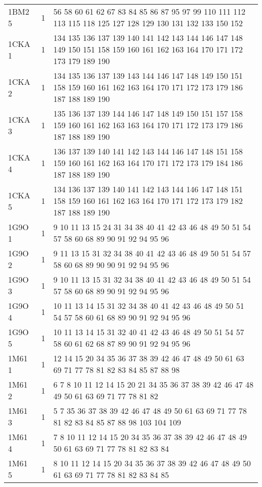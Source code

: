\begin{table}[!htbp]
{\begin{tabular}{lll}
        1BM2 5 & 1 & 56 58 60 61 62 67 83 84 85 86 87 95 97 99 110 111 112 113 115 118 125 127 128 129 130 131 132 133 150 152 \\
        1CKA 1 & 1 & 134 135 136 137 139 140 141 142 143 144 146 147 148 149 150 151 158 159 160 161 162 163 164 170 171 172 173 179 189 190 \\
        1CKA 2 & 1 & 134 135 136 137 139 143 144 146 147 148 149 150 151 158 159 160 161 162 163 164 170 171 172 173 179 186 187 188 189 190 \\
        1CKA 3 & 1 & 135 136 137 139 144 146 147 148 149 150 151 157 158 159 160 161 162 163 163 164 170 171 172 173 179 186 187 188 189 190 \\
        1CKA 4 & 1 & 136 137 139 140 141 142 143 144 146 147 148 151 158 159 160 161 162 163 164 170 171 172 173 179 184 186 187 188 189 190 \\
        1CKA 5 & 1 & 134 136 137 139 140 141 142 143 144 146 147 148 151 158 159 160 161 162 163 164 170 171 172 173 179 182 187 188 189 190 \\
        1G9O 1 & 1 & 9 10 11 13 15 24 31 34 38 40 41 42 43 46 48 49 50 51 54 57 58 60 68 89 90 91 92 94 95 96 \\
        1G9O 2 & 1 & 9 11 13 15 31 32 34 38 40 41 42 43 46 48 49 50 51 54 57 58 60 68 89 90 90 91 92 94 95 96 \\
        1G9O 3 & 1 & 9 10 11 13 15 31 32 34 38 40 41 42 43 46 48 49 50 51 54 57 58 60 68 89 90 91 92 94 95 96 \\
        1G9O 4 & 1 & 10 11 13 14 15 31 32 34 38 40 41 42 43 46 48 49 50 51 54 57 58 60 61 68 89 90 91 92 94 95 96 \\
        1G9O 5 & 1 & 10 11 13 14 15 31 32 40 41 42 43 46 48 49 50 51 54 57 58 60 61 62 68 87 89 90 91 92 94 95 96 \\
        1M61 1 & 1 & 12 14 15 20 34 35 36 37 38 39 42 46 47 48 49 50 61 63 69 71 77 78 81 82 83 84 85 87 88 98 \\
        1M61 2 & 1 & 6 7 8 10 11 12 14 15 20 21 34 35 36 37 38 39 42 46 47 48 49 50 61 63 69 71 77 78 81 82 \\
        1M61 3 & 1 & 5 7 35 36 37 38 39 42 46 47 48 49 50 61 63 69 71 77 78 81 82 83 84 85 87 88 98 103 104 109 \\
        1M61 4 & 1 & 7 8 10 11 12 14 15 20 34 35 36 37 38 39 42 46 47 48 49 50 61 63 69 71 77 78 81 82 83 84 \\
        1M61 5 & 1 & 8 10 11 12 14 15 20 34 35 36 37 38 39 42 46 47 48 49 50 61 63 69 71 77 78 81 82 83 84 85 \\

\end{tabular}}
\end{table}
